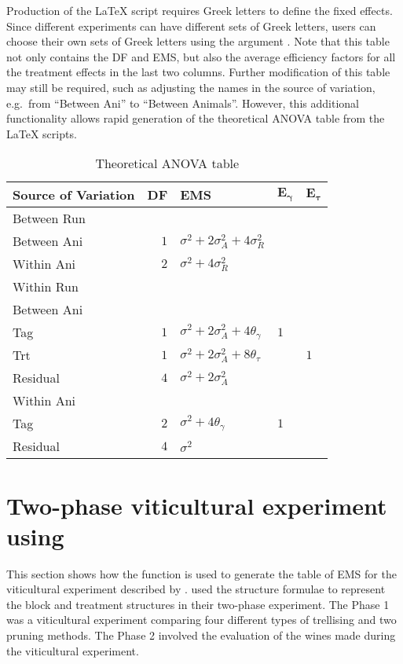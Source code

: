 \documentclass[article]{jss}
\begin{document}
Production of the {\LaTeX} script requires Greek letters to define the fixed effects. Since different experiments can have different sets of Greek letters, users can choose their own sets of Greek letters using the argument . Note that this table not only contains the DF and EMS, but also the average efficiency factors for all the treatment effects in the last two columns. Further modification of this table may still be required, such as adjusting the names in the source of variation, e.g.\ from ``Between Ani'' to ``Between Animals''. However, this additional functionality allows rapid generation of the theoretical ANOVA table from the {\LaTeX} scripts.  


\begin{table}[ht]
\centering
 \caption{Theoretical ANOVA table}
 \begin{tabular}[t]{lrlll} 
 \toprule 
 \multicolumn{1}{l}{\textbf{Source of Variation}} & \multicolumn{1}{l}{\textbf{DF}} & \multicolumn{1}{l}{\textbf{EMS}}& \multicolumn{1}{l}{$\bm{E_{\gamma}}$}&\multicolumn{1}{l}{$\bm{E_{\tau}}$}\\ 
 \midrule 
 Between Run &  &  & & \\ 
 \quad Between Ani & $1$ & $\sigma^2+2\sigma_{A}^2+4\sigma_{R}^2$ & & \\ \hline 
 \quad Within Ani & $2$ & $\sigma^2+4\sigma_{R}^2$ & & \\ \hline 
 Within Run &  &  & & \\ 
 \quad Between Ani &  &  & & \\ 
 \quad \quad Tag & $1$ & $\sigma^2+2\sigma_{A}^2+4\theta_{\gamma}$ &$1$ & \\ 
 \quad \quad Trt & $1$ & $\sigma^2+2\sigma_{A}^2+8\theta_{\tau}$ & & $1$\\ 
 \quad \quad Residual & $4$ & $\sigma^2+2\sigma_{A}^2$ & & \\ \hline 
 \quad Within Ani &  &  & & \\ 
 \quad \quad Tag & $2$ & $\sigma^2+4\theta_{\gamma}$ &$1$ & \\ 
 \quad \quad Residual & $4$ & $\sigma^2$ & & \\ 
 \bottomrule 
 \end{tabular} 
  \label{tab:ouputFromR} 
\end{table} 

\section[Example]{Two-phase viticultural experiment using }\label{sec:example}
This section shows how the function  is used to generate the table of EMS for the viticultural experiment described by \cite{Brien1999}. \citeauthor{Brien1999} used the structure formulae to represent the block and treatment structures in their two-phase experiment. The Phase 1 was a viticultural experiment comparing four different types of trellising and two pruning methods. The Phase 2 involved the evaluation of the wines made during the viticultural experiment.
\end{document}
